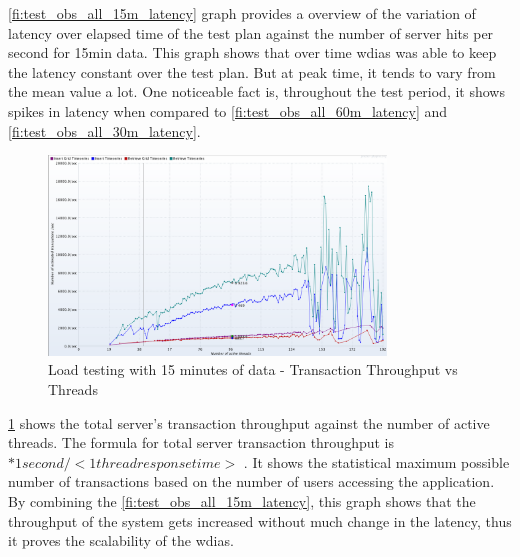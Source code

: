 \cref{fi:test_obs_all_15m_latency} graph provides a overview of the variation of latency over elapsed time of the test plan against the number of server hits per second for 15min data.
This graph shows that over time \acrshort{wdias} was able to keep the latency constant over the test plan. But at peak time, it tends to vary from the mean value a lot.
One noticeable fact is, throughout the test period, it shows spikes in latency when compared to \cref{fi:test_obs_all_60m_latency} and \cref{fi:test_obs_all_30m_latency}.

\begin{figure}[htp]
    \centering
    \includegraphics[width=0.8\textwidth]{results/obs/all/obs_all_15m_transaction_throughtput_vs_threads.png}
    \caption{Load testing with 15 minutes of data - Transaction Throughput vs Threads}
    \label{fi:test_obs_all_15m_throughtput}
\end{figure}

\cref{fi:test_obs_all_15m_throughtput} shows the total server's transaction throughput against the number of active threads.
The formula for total server transaction throughput is \(<active threads> * 1 second / <1  thread response time>\) \cite{JMeterPluginsTransactionPlugin}. It shows the statistical maximum possible number of transactions based on the number of users accessing the application.
By combining the \cref{fi:test_obs_all_15m_latency}, this graph shows that the throughput of the system gets increased without much change in the latency, thus it proves the scalability of the \acrshort{wdias}.

